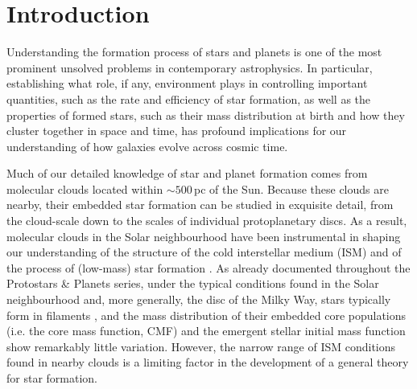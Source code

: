 \section{Introduction}



Understanding the formation process of stars and planets is one of the most prominent unsolved problems in contemporary astrophysics.
In particular, establishing what role, if any, environment plays in controlling important quantities, such as the rate and efficiency of star formation, as well as the properties of formed stars, such as their mass distribution at birth and how they cluster together in space and time, has profound implications for our understanding of how galaxies evolve across cosmic time. 

Much of our detailed knowledge of star and planet formation comes from molecular clouds located within $\sim500$\,pc of the Sun. Because these clouds are nearby, their embedded star formation can be studied in exquisite detail, from the cloud-scale down to the scales of individual protoplanetary discs. As a result, molecular clouds in the Solar neighbourhood have been instrumental in shaping our understanding of the structure of the cold interstellar medium (ISM) and of the process of (low-mass) star formation \citep{Ward-Thompson2007,Andre2014, Padoan2014}. As already documented throughout the Protostars \& Planets series, under the typical conditions found in the Solar neighbourhood and, more generally, the disc of the Milky Way, stars typically form in filaments \citep[][see also Pineda et al. and Hacar et al. this volume]{Andre2014}, and the mass distribution of their embedded core populations (i.e. the core mass function, CMF) and the emergent stellar initial mass function \citep[IMF;][]{Offner2014} show remarkably little variation. However, the narrow range of ISM conditions found in nearby clouds is a limiting factor in the development of a general theory for star formation. 

